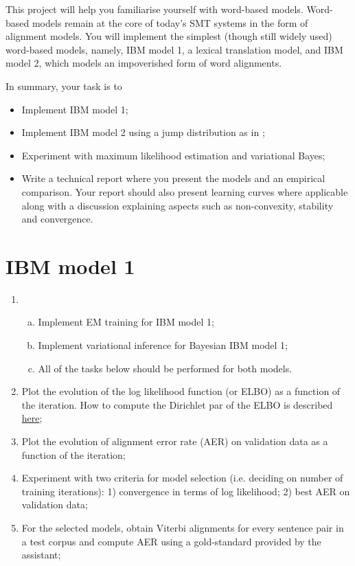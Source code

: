 
This project will help you familiarise yourself with word-based
models.  Word-based models remain at the core of today's SMT systems
in the form of alignment models.
You will implement the simplest (though still widely used) word-based
models, namely, IBM model 1, a lexical translation model, and IBM model 2, which models an impoverished form of word alignments.

In summary, your task is to

\begin{itemize}
	\item Implement IBM model 1;
	\item Implement IBM model 2 using a jump distribution as in \cite{Vogel+1996:HMMWA};
	\item Experiment with maximum likelihood estimation and variational Bayes;
	\item Write a technical report where you present the models and an empirical comparison. Your report should also present learning curves
    where applicable along with a discussion explaining aspects such
    as non-convexity, stability and convergence.
\end{itemize}

\section{IBM model 1}

\begin{enumerate}
	\item 
	\begin{enumerate}[a)]
		\item Implement EM training \citep{Brown+1993:smt} for IBM model 1;
		\item Implement variational inference for Bayesian IBM model 1;
		\item All of the tasks below should be performed for both models.
	\end{enumerate}
	\item Plot the evolution of the log likelihood function (or ELBO) as a function of the iteration. How to compute the Dirichlet par of the ELBO
	is described \href{https://github.com/philschulz/PublicWriting/blob/master/DirichletElbo/DirichletELBO.pdf}{here};
	\item Plot the evolution of alignment error rate (AER) on validation data as a function of the iteration;
	\item Experiment with two criteria for model selection (i.e. deciding on number of training iterations): 1) convergence in terms of log likelihood; 2) best AER on validation data;
	\item For the selected models, obtain Viterbi alignments for every sentence pair in a test corpus and compute AER using a gold-standard provided by the assistant;
\end{enumerate}

